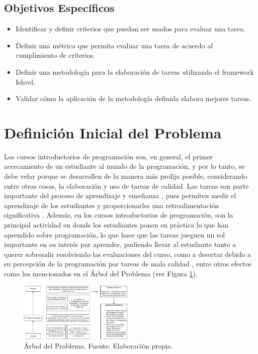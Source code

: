 \documentclass[conference]{IEEEtran}
\begin{document}
\subsection*{Objetivos Específicos}

\begin{itemize}
    \item Identificar y definir criterios que puedan ser usados para evaluar una tarea.
    \item Definir una métrica que permita evaluar una tarea de acuerdo al cumplimiento de criterios.
    \item Definir una metodología para la elaboración de tareas utilizando el framework Ishvel.
    \item Validar cómo la aplicación de la metodología definida elabora mejores tareas.
\end{itemize}

\section{Definición Inicial del Problema}

Los cursos introductorios de programación son, en general, el primer acercamiento de un estudiante al mundo de la programación, y por lo tanto, se debe velar porque se desarrollen de la manera más prolija posible, considerando entre otras cosas, la elaboración y uso de tareas de calidad. Las tareas son parte importante del proceso de aprendizaje y enseñanza \cite{texasU}, pues permiten medir el aprendizaje de los estudiantes y proporcionarles una retroalimentación significativa \cite{NAP12636}. Además, en los cursos introductorios de programación, son la principal actividad en donde los estudiantes ponen en práctica lo que han aprendido sobre programación, lo que hace que las tareas jueguen un rol importante en su interés por aprender, pudiendo llevar al estudiante tanto a querer sobresalir resolviendo las evaluaciones del curso, como a desertar debido a su percepción de la programación por tareas de mala calidad \cite{10.5555/1968521.1968545, 10.1145/2526968.2526982}, entre otros efectos como los mencionados en el Árbol del Problema (ver Figura \ref{arbolito}).

\begin{figure}[H]
    \centering
    \includegraphics[width=0.49\textwidth]{arbolito.png}
    \caption{Árbol del Problema. Fuente: Elaboración propia.}
    \label{arbolito}
\end{figure}
\end{document}
